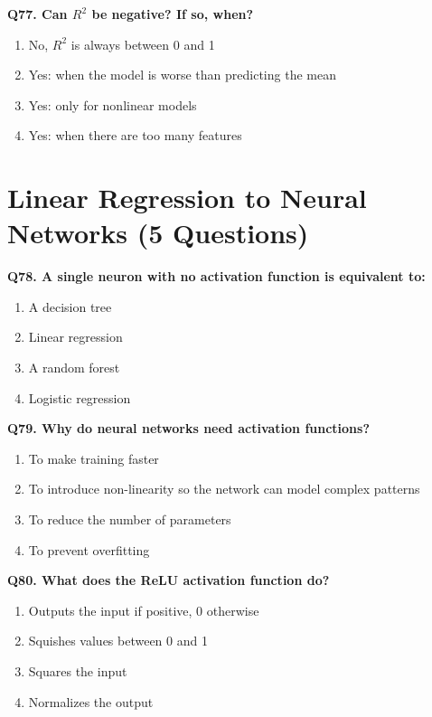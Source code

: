 \documentclass[12pt, a4paper]{article}
\newcommand{\question}[1]{\vspace{0.6em}\noindent\textbf{#1}}
\begin{document}
\question{Q77. Can $R^2$ be negative? If so, when?}
\begin{enumerate}[label=\alph*)]
    \item No, $R^2$ is always between 0 and 1
    \item Yes: when the model is worse than predicting the mean
    \item Yes: only for nonlinear models
    \item Yes: when there are too many features
\end{enumerate}

\section{Linear Regression to Neural Networks (5 Questions)}

\question{Q78. A single neuron with no activation function is equivalent to:}
\begin{enumerate}[label=\alph*)]
    \item A decision tree
    \item Linear regression
    \item A random forest
    \item Logistic regression
\end{enumerate}

\question{Q79. Why do neural networks need activation functions?}
\begin{enumerate}[label=\alph*)]
    \item To make training faster
    \item To introduce non-linearity so the network can model complex patterns
    \item To reduce the number of parameters
    \item To prevent overfitting
\end{enumerate}

\question{Q80. What does the ReLU activation function do?}
\begin{enumerate}[label=\alph*)]
    \item Outputs the input if positive, 0 otherwise
    \item Squishes values between 0 and 1
    \item Squares the input
    \item Normalizes the output
\end{enumerate}
\end{document}
